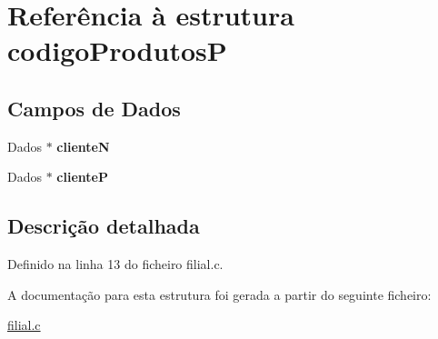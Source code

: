 \hypertarget{structcodigoProdutosP}{}\section{Referência à estrutura codigo\+ProdutosP}
\label{structcodigoProdutosP}
\subsection*{Campos de Dados}
\begin{DoxyCompactItemize}
\item 
\mbox{\label{structcodigoProdutosP_a5bf215fae3f6b45bd11e3be34aaa265d}} 
Dados $\ast$ {\bfseries clienteN}
\item 
\mbox{\label{structcodigoProdutosP_ae268e9ccd597d12e3f221b97c4008bdb}} 
Dados $\ast$ {\bfseries clienteP}
\end{DoxyCompactItemize}


\subsection{Descrição detalhada}


Definido na linha 13 do ficheiro filial.\+c.



A documentação para esta estrutura foi gerada a partir do seguinte ficheiro\+:\begin{DoxyCompactItemize}
\item 
\hyperlink{filial_8c}{filial.\+c}\end{DoxyCompactItemize}

